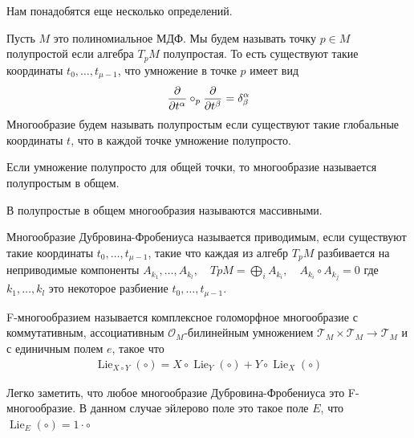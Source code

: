 Нам понадобятся еще несколько определений.
\begin{defin}
	Пусть \(M\) это полиномиальное МДФ. Мы будем называть точку \(p \in M\) полупростой если алгебра \(T_pM\) полупростая. То есть существуют такие координаты \(t_0, \dots, t_{\mu-1}\), что умножение в точке \(p\) имеет вид \[\tang[t^\alpha]\circ_p\tang[t^\beta] = \delta^\alpha_\beta\]
	Многообразие будем называть полупростым если существуют такие глобальные координаты \(t\), что в каждой точке умножение полупросто.
\end{defin}
\begin{defin}
	Если умножение полупросто для общей точки, то многообразие называется полупростым в общем.
\end{defin}
В \cite{hertling} полупростые в общем многообразия называются массивными.
\begin{defin}
	Многообразие Дубровина-Фробениуса называется приводимым, если существуют такие координаты \(t_0, \dots, t_{\mu-1}\), такие что каждая из алгебр \(T_pM\) разбивается на неприводимые компоненты \(A_{k_1}, \dots, A_{k_l},\quad TpM = \bigoplus_i A_{k_i}, \quad A_{k_i}\circ A_{k_j} = 0\) где \(k_1, \dots, k_l\) это некоторое разбиение \(t_0, \dots, t_{\mu-1}\).
\end{defin}
\begin{defin}[F-manifold]
	F-многообразием называется комплексное голоморфное многообразие с коммутативным, ассоциативным \(\mathcal{O}_M\)-билинейным умножением \(\mathcal{T}_M \times \mathcal{T}_M \to \mathcal{T}_M\) и с единичным полем \(e\), такое что 
	\begin{gather}\label{integr}
		\operatorname{Lie}_{X\circ Y}(\circ) = X\circ \operatorname{Lie}_Y(\circ) + Y\circ \operatorname{Lie}_X(\circ)
	\end{gather}
\end{defin}
Легко заметить, что любое многообразие Дубровина-Фробениуса это F-многообразие.
В данном случае эйлерово поле это такое поле \(E\), что \(\operatorname{Lie}_E(\circ) = 1 \cdot \circ\)
